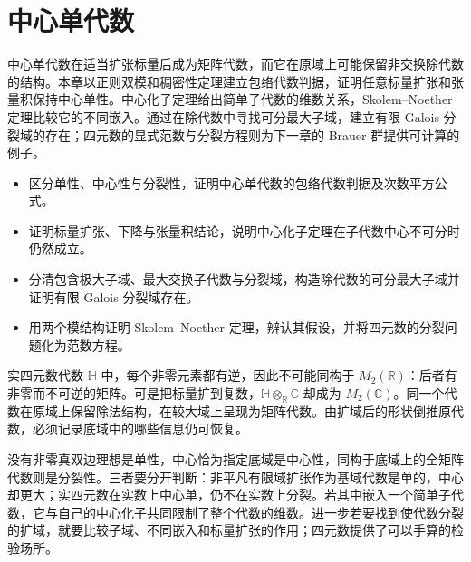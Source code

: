 
\chapter{中心单代数}
\label{b2:ch:17}

\begin{chapterabstract}
	中心单代数在适当扩张标量后成为矩阵代数，而它在原域上可能保留非交换除代数的结构。本章以正则双模和稠密性定理建立包络代数判据，证明任意标量扩张和张量积保持中心单性。中心化子定理给出简单子代数的维数关系，Skolem–Noether 定理比较它的不同嵌入。通过在除代数中寻找可分最大子域，建立有限 Galois 分裂域的存在；四元数的显式范数与分裂方程则为下一章的 Brauer 群提供可计算的例子。
\end{chapterabstract}

\begin{learninggoals}
	\begin{itemize}
		\item 区分单性、中心性与分裂性，证明中心单代数的包络代数判据及次数平方公式。
		\item 证明标量扩张、下降与张量积结论，说明中心化子定理在子代数中心不可分时仍然成立。
		\item 分清包含极大子域、最大交换子代数与分裂域，构造除代数的可分最大子域并证明有限 Galois 分裂域存在。
		\item 用两个模结构证明 Skolem–Noether 定理，辨认其假设，并将四元数的分裂问题化为范数方程。
	\end{itemize}
\end{learninggoals}

实四元数代数 \(\mathbb H\) 中，每个非零元素都有逆，因此不可能同构于 \(M_2(\mathbb R)\)：后者有非零而不可逆的矩阵。可是把标量扩到复数，\(\mathbb H\otimes_{\mathbb R}\mathbb C\) 却成为 \(M_2(\mathbb C)\)。同一个代数在原域上保留除法结构，在较大域上呈现为矩阵代数。由扩域后的形状倒推原代数，必须记录底域中的哪些信息仍可恢复。

\ProseParagraphBreak

没有非零真双边理想是单性，中心恰为指定底域是中心性，同构于底域上的全矩阵代数则是分裂性。三者要分开判断：非平凡有限域扩张作为基域代数是单的，中心却更大；实四元数在实数上中心单，仍不在实数上分裂。若其中嵌入一个简单子代数，它与自己的中心化子共同限制了整个代数的维数。进一步若要找到使代数分裂的扩域，就要比较子域、不同嵌入和标量扩张的作用；四元数提供了可以手算的检验场所。

\ProseParagraphBreak

